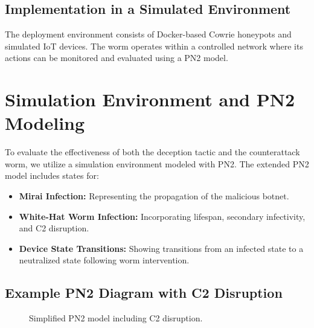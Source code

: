 \documentclass{article}
\begin{document}
\subsection{Implementation in a Simulated Environment}
The deployment environment consists of Docker-based Cowrie honeypots and simulated IoT devices. The worm operates within a controlled network where its actions can be monitored and evaluated using a PN2 model.

\section{Simulation Environment and PN2 Modeling}
\noindent
To evaluate the effectiveness of both the deception tactic and the counterattack worm, we utilize a simulation environment modeled with PN2. The extended PN2 model includes states for:
\begin{itemize}
    \item \textbf{Mirai Infection:} Representing the propagation of the malicious botnet.
    \item \textbf{White-Hat Worm Infection:} Incorporating lifespan, secondary infectivity, and C2 disruption.
    \item \textbf{Device State Transitions:} Showing transitions from an infected state to a neutralized state following worm intervention.
\end{itemize}

\subsection{Example PN2 Diagram with C2 Disruption}
\begin{figure}[h]
\centering
{}
\caption{Simplified PN2 model including C2 disruption.}
\label{fig:pn2_c2}
\end{figure}
\end{document}
